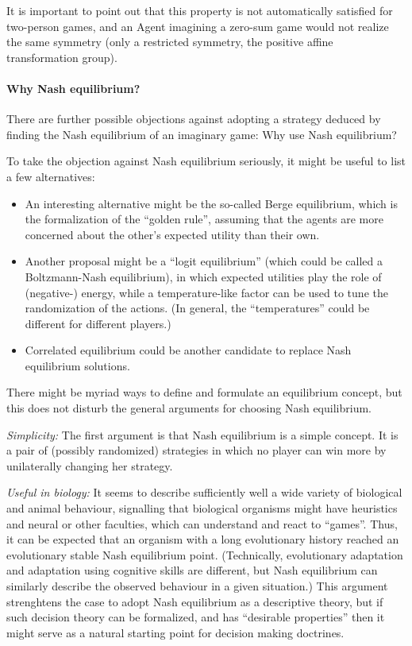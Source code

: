 \documentclass{article}
\begin{document}
It is important to point out that this property is not automatically satisfied for two-person games, and an Agent imagining a zero-sum game would not realize the same symmetry (only a restricted symmetry, the positive affine transformation group).

\paragraph{Why Nash equilibrium?}
There are further possible objections against adopting a strategy deduced by finding the Nash equilibrium of an imaginary game:
Why use Nash equilibrium?

To take the objection against Nash equilibrium seriously, it might be useful to list a few alternatives:
\begin{itemize}
    \item An interesting alternative might be the so-called Berge equilibrium, which is the formalization of the ``golden rule'', assuming that the agents are more concerned about the other's expected utility than their own.
    \item Another proposal might be a ``logit equilibrium'' (which could be called a Boltzmann-Nash equilibrium), in which expected utilities play the role of (negative-) energy, while a temperature-like factor can be used to tune the randomization of the actions. (In general, the ``temperatures'' could be different for different players.)
    \item Correlated equilibrium could be another candidate to replace Nash equilibrium solutions.
\end{itemize}

There might be myriad ways to define and formulate an equilibrium concept, but this does not disturb the general arguments for choosing Nash equilibrium.

{\it Simplicity:}
The first argument is that Nash equilibrium is a simple concept. It is a pair of (possibly randomized) strategies in which no player can win more by unilaterally changing her strategy.

{\it Useful in biology:}
It seems to describe sufficiently well a wide variety of biological and animal behaviour, signalling that biological organisms might have heuristics and neural or other faculties, which can understand and react to ``games''. Thus, it can be expected that an organism with a long evolutionary history reached an evolutionary stable Nash equilibrium point. (Technically, evolutionary adaptation and adaptation using cognitive skills are different, but Nash equilibrium can similarly describe the observed behaviour in a given situation.)
This argument strenghtens the case to adopt Nash equilibrium as a descriptive theory, but if such decision theory can be formalized, and has ``desirable properties'' then it might serve as a natural starting point for decision making doctrines.
\end{document}
